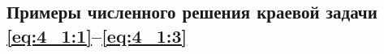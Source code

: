 %
%
%
%
%
%

\subsection{Примеры численного решения краевой задачи \eqref{eq:4_1:1}--\eqref{eq:4_1:3}}
\label{subsec:ch4/sec1/boundary}



